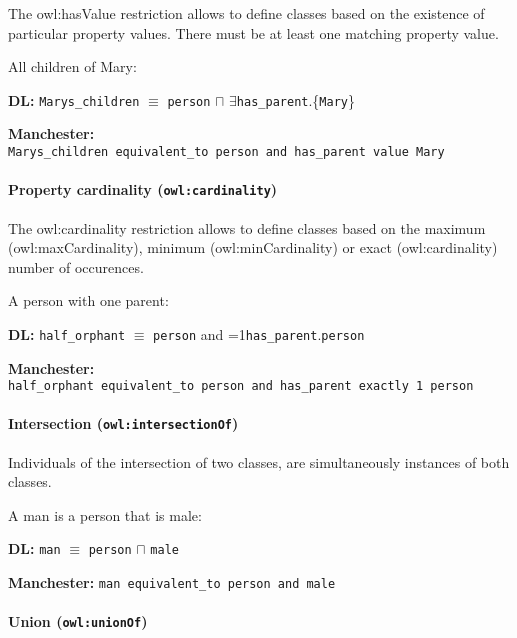 \documentclass[a4paper,]{report}
\let\oldparagraph\paragraph
\renewcommand{\paragraph}[1]{\oldparagraph{#1}\mbox{}}
\begin{document}
The owl:hasValue restriction allows to define classes based on the
existence of particular property values. There must be at least one
matching property value.

All children of Mary:

\textbf{DL:} \texttt{Marys\_children} \(\equiv\) \texttt{person}
\(\sqcap\) \(\exists\)\texttt{has\_parent}.\{\texttt{Mary}\}

\textbf{Manchester:}
\texttt{Marys\_children\ equivalent\_to\ person\ and\ has\_parent\ value\ Mary}

\hypertarget{property-cardinality-owlcardinality}{%
\paragraph{\texorpdfstring{Property cardinality
(\texttt{owl:cardinality})}{Property cardinality (owl:cardinality)}}\label{property-cardinality-owlcardinality}}

The owl:cardinality restriction allows to define classes based on the
maximum (owl:maxCardinality), minimum (owl:minCardinality) or exact
(owl:cardinality) number of occurences.

A person with one parent:

\textbf{DL:} \texttt{half\_orphant} \(\equiv\) \texttt{person} and
=1\texttt{has\_parent}.\texttt{person}

\textbf{Manchester:}
\texttt{half\_orphant\ equivalent\_to\ person\ and\ has\_parent\ exactly\ 1\ person}

\hypertarget{intersection-owlintersectionof}{%
\paragraph{\texorpdfstring{Intersection
(\texttt{owl:intersectionOf})}{Intersection (owl:intersectionOf)}}\label{intersection-owlintersectionof}}

Individuals of the intersection of two classes, are simultaneously
instances of both classes.

A man is a person that is male:

\textbf{DL:} \texttt{man} \(\equiv\) \texttt{person} \(\sqcap\)
\texttt{male}

\textbf{Manchester:} \texttt{man\ equivalent\_to\ person\ and\ male}

\hypertarget{union-owlunionof}{%
\paragraph{\texorpdfstring{Union
(\texttt{owl:unionOf})}{Union (owl:unionOf)}}\label{union-owlunionof}}
\end{document}
